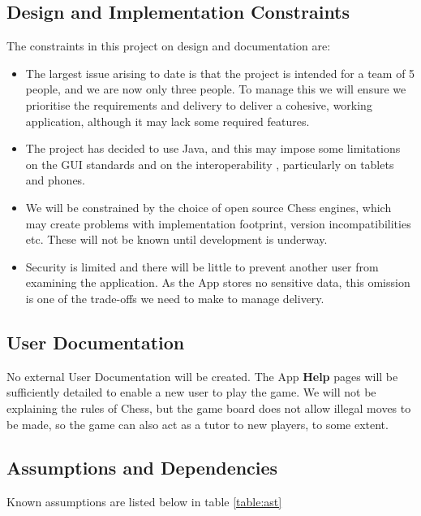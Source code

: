 \documentclass[a4paper,10pt]{article}
\begin{document}
\clearpage
\pagebreak

\subsection{Design and Implementation Constraints}

The constraints in this project on design and documentation are:


\begin{itemize}
  \item The largest issue arising to date is that the project is intended for a team of 5 people, and we are now only three people. To manage this we will ensure we prioritise the requirements and delivery to deliver a cohesive, working application, although it may lack some required features. 
  \item The project has decided to use Java, and this may impose some limitations on the GUI standards and on the interoperability , particularly on tablets and phones. 
  \item We will be constrained by the choice of open source Chess engines, which may create problems with implementation footprint, version incompatibilities etc. These will not be known until development is underway.  
\item Security is limited and there will be little to prevent another user from examining the application. As the App stores no sensitive data, this omission is one of the trade-offs we need to make to manage delivery. 
\end{itemize}



\subsection{User Documentation}
No external User Documentation will be created. The App \textbf{Help} pages will be sufficiently detailed to enable a new user to play the game. We will not be explaining the rules of Chess, but the game board does not allow illegal moves to be made, so the game can also act as a tutor to new players, to some extent. 

\subsection{Assumptions and Dependencies}

Known assumptions are listed below in table \ref{table:ast} 
\end{document}
